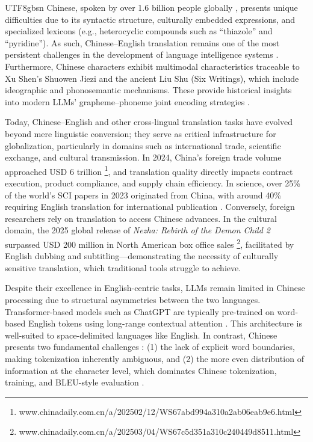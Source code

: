 \documentclass[conference]{IEEEtran}
\begin{document}
\begin{CJK*}{UTF8}{gbsn}
Chinese, spoken by over 1.6 billion people globally \citep{eberhard2023ethnologue}, presents unique difficulties due to its syntactic structure, culturally embedded expressions, and specialized lexicons (e.g., heterocyclic compounds such as “thiazole” and “pyridine”). As such, Chinese–English translation remains one of the most persistent challenges in the development of language intelligence systems \citep{sun2021chinesebert}. Furthermore, Chinese characters exhibit multimodal characteristics traceable to Xu Shen’s Shuowen Jiezi and the ancient Liu Shu (Six Writings), which include ideographic and phonosemantic mechanisms. These provide historical insights into modern LLMs’ grapheme–phoneme joint encoding strategies \citep{weigang2024six}.

Today, Chinese–English and other cross-lingual translation tasks have evolved beyond mere linguistic conversion; they serve as critical infrastructure for globalization, particularly in domains such as international trade, scientific exchange, and cultural transmission. In 2024, China’s foreign trade volume approached USD 6 trillion \footnote{www.chinadaily.com.cn/a/202502/12/WS67abd994a310a2ab06eab9e6.html}, and translation quality directly impacts contract execution, product compliance, and supply chain efficiency. In science, over 25\% of the world's SCI papers in 2023 originated from China, with around 40\% requiring English translation for international publication \citep{jiang2020nsfc}. Conversely, foreign researchers rely on translation to access Chinese advances. In the cultural domain, the 2025 global release of \textit{Nezha: Rebirth of the Demon Child 2} surpassed USD 200 million in North American box office sales \footnote{www.chinadaily.com.cn/a/202503/04/WS67c5d351a310c240449d8511.html}, facilitated by English dubbing and subtitling—demonstrating the necessity of culturally sensitive translation, which traditional tools struggle to achieve.

Despite their excellence in English-centric tasks, LLMs remain limited in Chinese processing due to structural asymmetries between the two languages. Transformer-based models such as ChatGPT are typically pre-trained on word-based English tokens using long-range contextual attention \citep{vaswani2017attention}. This architecture is well-suited to space-delimited languages like English. In contrast, Chinese presents two fundamental challenges \citep{weigang2024threshold}: (1) the lack of explicit word boundaries, making tokenization inherently ambiguous, and (2) the more even distribution of information at the character level, which dominates Chinese tokenization, training, and BLEU-style evaluation \citep{papineni2002bleu}.


\end{CJK*}
\end{document}
